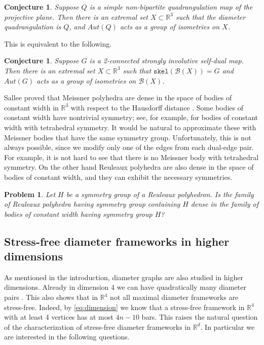 \documentclass[10pt,a4paper]{article}
\newtheorem{conjecture}[theorem]{Conjecture}
\newtheorem{problem}[theorem]{Problem}
\newcounter{example}
\newcommand{\R}[0]{\mathbb{R}}
\newcommand{\Bc}[0]{\mathcal{B}}
\newcommand{\skel}[0]{\mathtt{skel}}
\begin{document}
\begin{conjecture}
    Suppose $Q$ is a simple non-bipartite quadrangulation map of the projective plane. Then there is an extremal set $X\subset \R^3$ such that the diameter quadrangulation is $Q$, and $Aut(Q)$ acts as a group of isometries on $X$. 
\end{conjecture}

This is equivalent to the following.

\begin{conjecture}
    Suppose $G$ is a 2-connected strongly involutive self-dual map.  Then there is an extremal set $X\subset \R^3$ such that $\skel (\Bc(X))=G$ and $Aut(G)$ acts as a group of isometries on $\Bc(X)$. 
\end{conjecture}



Sallee proved that Meissner polyhedra are dense in the space of bodies of constant width in $\R^3$ with respect to the Hausdorff distance \cite{sallee1970reuleaux, hynd2024density}. Some bodies of constant width have nontrivial symmetry; see, for example, \cite{arman2024small,arman2025small} for bodies of constant width with tetrahedral symmetry. It would be natural to approximate these with Meissner bodies that have the same symmetry group. Unfortunately, this is not always possible, since we modify only one of the edges from each dual-edge pair. For example, it is not hard to see that there is no Meissner body with tetrahedral symmetry. On the other hand Reuleaux polyhedra are also dense in the space of bodies of constant width, and they can exhibit the necessary symmetries. 
\begin{problem}\label{prob:densesym}
    Let $H$ be a symmetry group of a Reuleaux polyhedron. Is the family of Reuleaux polyhedra having symmetry group containing $H$ dense in the family of bodies of constant width having symmetry group $H$?
    
\end{problem} 




\subsection{Stress-free diameter frameworks in higher dimensions}
As mentioned in the introduction, diameter graphs are also studied in higher dimensions. Already in dimension 4 we can have quadratically many diameter pairs \cite{erdHos1959sets,swanepoel2009unit}. This also shows that in $\R^4$ not all maximal diameter frameworks are stress-free. Indeed, by \eqref{eq:dimension} we know that a stress-free framework in $\R^4$ with at least 4 vertices has at most $4n-10$ bars. This raises the  natural question of the characterization of stress-free diameter frameworks in $\R^d$. In particular we are interested in the following questions.
\end{document}
